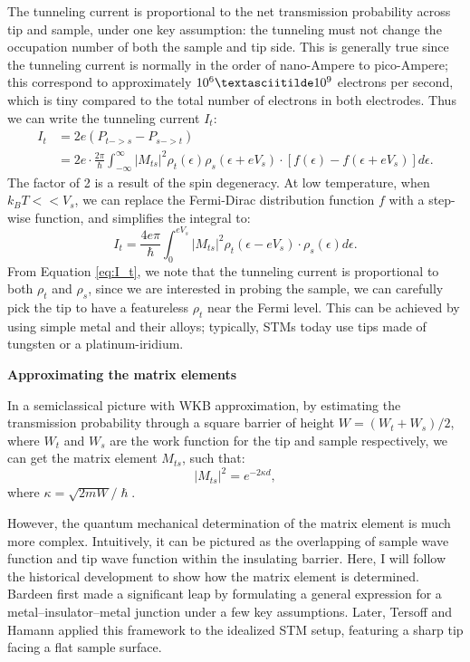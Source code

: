 The tunneling current is proportional to the net transmission probability across tip and sample, under one key assumption: the tunneling must not change the occupation number of both the sample and tip side. This is generally true since the tunneling current is normally in the order of nano-Ampere to pico-Ampere; this correspond to approximately $10^6 \textasciitilde 10^9$ electrons per second, which is tiny compared to the total number of electrons in both electrodes. Thus we can write the tunneling current $I_t$:
\begin{align}
	I_t & = 2e(P_{t->s}-P_{s->t})\\
	& = 2e \cdot \frac{2\pi}{\hslash}\int_{-\infty}^{\infty}|M_{ts}|^2\rho_t(\epsilon) \rho_s(\epsilon + eV_s) \cdot[f(\epsilon) - f(\epsilon + eV_s)] d\epsilon.
\end{align}
The factor of 2 is a result of the spin degeneracy. At low temperature, when $k_BT<<V_s$, we can replace the Fermi-Dirac distribution function $f$ with a step-wise function, and simplifies the integral to: 
\begin{equation}
	\label{eq:I_t}
	I_t = \frac{4e\pi}{\hslash}\int_{0}^{eV_s}|M_{ts}|^2\rho_t(\epsilon - eV_s) \cdot \rho_s(\epsilon)d\epsilon. 
\end{equation} 
From Equation \ref{eq:I_t}, we note that the tunneling current is proportional to both $\rho_t$ and $\rho_s$, since we are interested in probing the sample, we can carefully pick the tip to have a featureless $\rho_t$ near the Fermi level. This can be achieved by using simple metal and their alloys; typically, \ac{STM}s today use tips made of tungsten or a platinum-iridium.


\vspace{1em}
\noindent\textbf{Approximating the matrix elements}

\noindent In a semiclassical picture with WKB approximation, by estimating the transmission probability through a square barrier of height $W = (W_t + W_s)/2$, where $W_t$ and $W_s$ are the work function for the tip and sample respectively, we can get the matrix element $M_{ts}$, such that: 
\begin{equation}
	|M_{ts}|^2 = e^{-2\kappa d},
\end{equation}
where $\kappa = \sqrt{2mW}/\hslash$.

However, the quantum mechanical determination of the matrix element is much more complex. Intuitively, it can be pictured as the overlapping of sample wave function and tip wave function within the insulating barrier. Here, I will follow the historical development to show how the matrix element is determined. Bardeen first made a significant leap by formulating a general expression for a metal–insulator–metal junction under a few key assumptions. Later, Tersoff and Hamann applied this framework to the idealized STM setup, featuring a sharp tip facing a flat sample surface.


